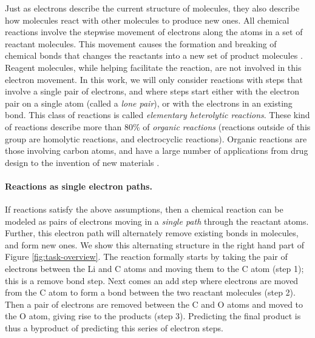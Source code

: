 Just as electrons describe the current structure of molecules, 
they also describe how molecules react with other molecules to produce new ones. All chemical reactions involve the stepwise movement of electrons along the atoms in a set of reactant molecules. 
This movement causes the formation and breaking of chemical bonds that changes the reactants into a new set of product molecules \cite{herges1994coarctate}. Reagent molecules, while helping facilitate the reaction, are not involved in this electron movement.
In this work, we will only consider reactions with steps that involve a single pair of electrons, and
where steps start either with the electron pair on a single atom (called a \emph{lone pair}), or with the electrons in an existing bond. This class of reactions is called \emph{elementary heterolytic reactions}.
These kind of reactions describe more than 80\% of \emph{organic reactions} \cite{herges1994coarctate} 
(reactions outside of this group are homolytic reactions, and electrocyclic reactions).
Organic reactions are those involving carbon atoms, and have a large number of applications from drug design to the invention of new materials \citep{segler2018planning}.

\vspace{-0.15cm}
\paragraph{Reactions as single electron paths.}
If reactions satisfy the above assumptions, then a chemical reaction can be modeled as pairs of electrons moving in a \emph{single path} through the reactant atoms. 
Further, this electron path will alternately remove existing bonds in molecules, and form new ones. We show this alternating structure in the right hand part of Figure \ref{fig:task-overview}. 
The reaction formally starts by taking the pair of electrons between the Li and C atoms and moving them to the C atom (step 1); this is a remove bond step. 
Next comes an add step where electrons are moved from the C atom to form a bond between the two reactant molecules (step 2).
Then a pair of electrons are removed between the C and O atoms and moved to the O atom, giving rise to the products (step 3). 
Predicting the final product is thus a byproduct of predicting this series of electron steps.

